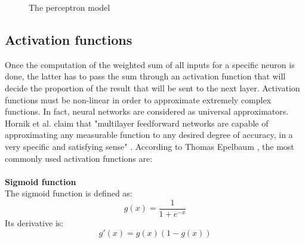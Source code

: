 \begin{figure}[!h]
\centering
\caption{The perceptron model}
\label{perceptron_model}
\end{figure}

\subsection{Activation functions}
\label{activation_functions}
\setlength{\marginparwidth}{2cm}\leavevmode {}
Once the computation of the weighted sum of all inputs for a specific neuron is done, the latter has to pass the sum through an activation function that will decide the proportion of the result that will be sent to the next layer. Activation functions must be non-linear in order to approximate extremely complex functions. In fact, neural networks are considered as universal approximators. Hornik et al. claim that "multilayer feedforward networks are capable of approximating any measurable function to any desired degree of accuracy, in a very specific and satisfying sense" \cite{17}. According to Thomas Epelbaum \cite{18}, the most commonly used activation functions are:\\\\
 \noindent \textbf{Sigmoid function}\\
 The sigmoid function is defined as:
 \begin{equation}
  g(x) = \frac{1}{1+e^{-x}}
 \end{equation}
 Its derivative is:
 \begin{equation}
 g'(x) = g(x)(1-g(x))
 \end{equation}
 



